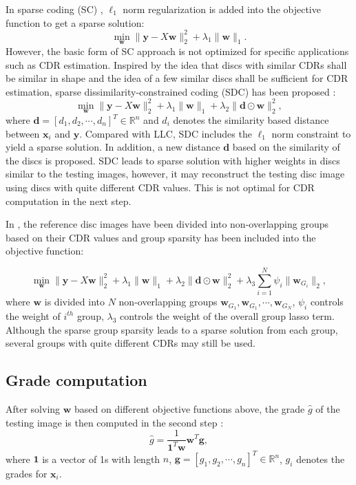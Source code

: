 \documentclass[journal]{IEEEtran}
\begin{document}
 In sparse coding (SC) \cite{sparsecoding}, $\ell_1$ norm regularization is added into the objective function to get a sparse solution:
       \begin{equation}
   \min_{\textbf{w}} \|{\textbf{y}}-{X}\textbf{w}\|^2_2+\lambda_1 \|\textbf{w}\|_1.  \label{scobj}
   \end{equation}
      However, the basic form of SC approach is not optimized for specific applications such as CDR estimation.
      Inspired by the idea that discs with similar CDRs shall be similar in shape and the idea of a few similar discs shall be sufficient for CDR estimation,  sparse dissimilarity-constrained coding (SDC) has been proposed \cite{CJ15}:
      \begin{equation} \min_{\textbf{w}}\|{\textbf{y}}-{X}\textbf{w}\|^2_2+ \lambda_1 \|\textbf{w}\|_1+ \lambda_2\| \textbf{d}\odot \textbf{w}\|_2^2,
    \end{equation}
      where $\textbf{d}=[d_1, d_2, \cdots, d_n]^T\in \mathbb{R}^n$ and $d_i$ denotes the similarity based distance  between $\textbf{x}_i$ and $\textbf{y}$.
    Compared with LLC, SDC includes the $\ell_1$ norm constraint to yield a sparse solution. In addition, a new distance $\textbf{d}$ based on  the similarity  of the discs is proposed.
   SDC leads to sparse solution with higher weights in discs similar to the testing images, however, it may reconstruct the testing disc image using discs with quite different CDR values. This is not optimal for CDR computation in the next step.

    In \cite{Cheng:17BOE}, the reference disc images have been divided into non-overlapping groups based on their CDR values  and  group sparsity has been included into the objective function:

      \begin{equation} \min_{\textbf{w}}\|{\textbf{y}}-{X}\textbf{w}\|^2_2+ \lambda_1 \|\textbf{w}\|_1+ \lambda_2\| \textbf{d}\odot \textbf{w}\|_2^2+\lambda_3   \sum_{i=1}^N\psi_i\|\textbf{w}_{G_i}\|_2,
    \end{equation}
   where $\textbf{w}$ is divided into $N$ non-overlapping groups $\textbf{w}_{G_1}, \textbf{w}_{G_1}, \cdots, \textbf{w}_{G_N}$, $\psi_i$ controls the weight of $i^{th}$ group,
   ${\lambda_3}$ controls the weight of the overall group lasso term.
   Although the sparse group sparsity leads to a sparse solution from each group, several groups with quite different CDRs may still be used.

       \subsection{Grade computation}
   After solving $\textbf{w}$   based on different objective functions above,  the grade $\hat{g}$  of the testing image is then computed in the second step \cite{CJ15}:
  \begin{equation}
  \hat{g}=\frac{1}{\textbf{1}^T\textbf{w}}\textbf{w}^T\textbf{g} ,   \label{eq5}
  \end{equation}
  where $\textbf{1}$ is a vector of 1s with length $n$, $\textbf{g}=[g_1, g_2, \cdots, g_n]^T\in \mathbb{R}^n$, $g_i$ denotes the grades for $\textbf{x}_i$.
\end{document}
